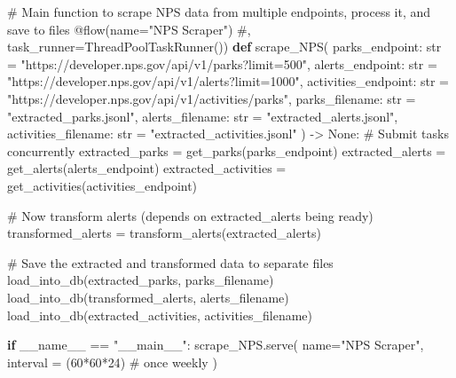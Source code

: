 \documentclass[
  letterpaper,
  DIV=11,
  numbers=noendperiod]{scrartcl}
\newenvironment{Shaded}{\begin{snugshade}}{\end{snugshade}}
\newcommand{\AttributeTok}[1]{\textcolor[rgb]{0.40,0.45,0.13}{#1}}
\newcommand{\BuiltInTok}[1]{\textcolor[rgb]{0.00,0.23,0.31}{#1}}
\newcommand{\CommentTok}[1]{\textcolor[rgb]{0.37,0.37,0.37}{#1}}
\newcommand{\ControlFlowTok}[1]{\textcolor[rgb]{0.00,0.23,0.31}{\textbf{#1}}}
\newcommand{\DecValTok}[1]{\textcolor[rgb]{0.68,0.00,0.00}{#1}}
\newcommand{\KeywordTok}[1]{\textcolor[rgb]{0.00,0.23,0.31}{\textbf{#1}}}
\newcommand{\NormalTok}[1]{\textcolor[rgb]{0.00,0.23,0.31}{#1}}
\newcommand{\OperatorTok}[1]{\textcolor[rgb]{0.37,0.37,0.37}{#1}}
\newcommand{\StringTok}[1]{\textcolor[rgb]{0.13,0.47,0.30}{#1}}
\newcommand{\VariableTok}[1]{\textcolor[rgb]{0.07,0.07,0.07}{#1}}
\begin{document}
\begin{Shaded}
\begin{Highlighting}[]
\CommentTok{\# Main function to scrape NPS data from multiple endpoints, process it, and save to files}
\AttributeTok{@flow}\NormalTok{(name}\OperatorTok{=}\StringTok{"NPS Scraper"}\NormalTok{) }\CommentTok{\#, task\_runner=ThreadPoolTaskRunner())}
\KeywordTok{def}\NormalTok{ scrape\_NPS(}
\NormalTok{    parks\_endpoint: }\BuiltInTok{str} \OperatorTok{=} \StringTok{"https://developer.nps.gov/api/v1/parks?limit=500"}\NormalTok{,}
\NormalTok{    alerts\_endpoint: }\BuiltInTok{str} \OperatorTok{=} \StringTok{"https://developer.nps.gov/api/v1/alerts?limit=1000"}\NormalTok{,}
\NormalTok{    activities\_endpoint: }\BuiltInTok{str} \OperatorTok{=} \StringTok{"https://developer.nps.gov/api/v1/activities/parks"}\NormalTok{,}
\NormalTok{    parks\_filename: }\BuiltInTok{str} \OperatorTok{=} \StringTok{"extracted\_parks.jsonl"}\NormalTok{,}
\NormalTok{    alerts\_filename: }\BuiltInTok{str} \OperatorTok{=} \StringTok{"extracted\_alerts.jsonl"}\NormalTok{,}
\NormalTok{    activities\_filename: }\BuiltInTok{str} \OperatorTok{=} \StringTok{"extracted\_activities.jsonl"}
\NormalTok{) }\OperatorTok{{-}\textgreater{}} \VariableTok{None}\NormalTok{:}
     \CommentTok{\# Submit tasks concurrently}
\NormalTok{    extracted\_parks }\OperatorTok{=}\NormalTok{ get\_parks(parks\_endpoint)}
\NormalTok{    extracted\_alerts }\OperatorTok{=}\NormalTok{ get\_alerts(alerts\_endpoint)}
\NormalTok{    extracted\_activities }\OperatorTok{=}\NormalTok{ get\_activities(activities\_endpoint)}

    \CommentTok{\# Now transform alerts (depends on extracted\_alerts being ready)}
\NormalTok{    transformed\_alerts }\OperatorTok{=}\NormalTok{ transform\_alerts(extracted\_alerts)}

    \CommentTok{\# Save the extracted and transformed data to separate files}
\NormalTok{    load\_into\_db(extracted\_parks, parks\_filename)}
\NormalTok{    load\_into\_db(transformed\_alerts, alerts\_filename)}
\NormalTok{    load\_into\_db(extracted\_activities, activities\_filename)}


\ControlFlowTok{if} \VariableTok{\_\_name\_\_} \OperatorTok{==} \StringTok{"\_\_main\_\_"}\NormalTok{:}
\NormalTok{  scrape\_NPS.serve(}
\NormalTok{      name}\OperatorTok{=}\StringTok{"NPS Scraper"}\NormalTok{,}
\NormalTok{      interval }\OperatorTok{=}\NormalTok{ (}\DecValTok{60}\OperatorTok{*}\DecValTok{60}\OperatorTok{*}\DecValTok{24}\NormalTok{) }\CommentTok{\# once weekly}
\NormalTok{)}
\end{Highlighting}
\end{Shaded}
\end{document}
